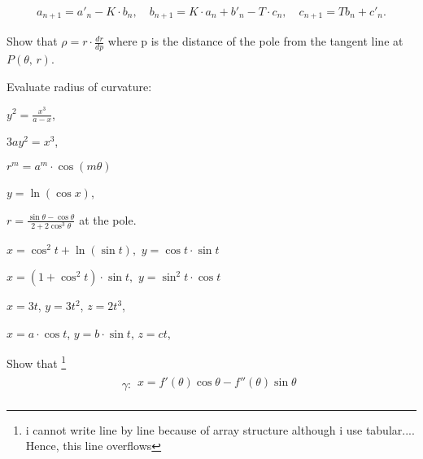 \documentclass[11pt]{amsbook}
\begin{document}

\begin{align*}
a_{n+1} = a'_n -K \cdot b_n, \quad b_{n+1} = K \cdot a_n + b'_n -T \cdot c_n,\quad c_{n+1} = T b_n + c'_n. 
\end{align*}

\begin{hEnumerateArabic}
	\item Show that $\rho = r \cdot \frac{dr}{dp}$ where p is the distance of the pole from the tangent line at $P(\theta,\, r)$.
	\item Evaluate radius of curvature:
		\begin{hEnumerateAlpha} 
		    \begin{multicols}{3}
		    \item $y^2 = \frac{x^3}{a-x}$,
		    \columnbreak
		    \item $3ay^2 = x^3$, 
		    \columnbreak
		    \item $r^m = a^m \cdot \cos(m \theta)$
		    \end{multicols}
		    \begin{multicols}{2}
		    \item $y = \ln(\cos x)$,
		    \columnbreak
		    \item $r = \frac{\sin\theta -\cos\theta}{2 + 2\cos^3\theta}$ at the pole. 
		    \end{multicols}
		    \item $x= \cos^2 t + \ln(\sin t),$ \quad $y =\cos t \cdot \sin t$\\
		    \item $x= (1 + \cos^2 t) \cdot \sin t,$ \quad $y =\sin^2 t \cdot \cos t$
		    \begin{multicols}{2}
		    \item $x=3t$, $y=3t^2$, $z=2t^3$,
		    \columnbreak
		    \item $x=a \cdot \cos t$, $y=b \cdot \sin t$, $z=ct$,
		    \end{multicols}
		\end{hEnumerateAlpha}
	\item Show that \footnote{i cannot write line by line because of array structure although i use tabular.... Hence, this line overflows}
		\begin{align*}
        			\gamma :  \left. \begin{array}{lr}
        			x = f'(\theta)\cos\theta - f''(\theta)\sin\theta \\

\end{array}
\end{align*}
\end{hEnumerateArabic}
\end{document}
